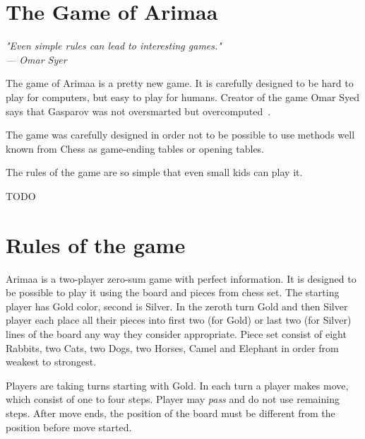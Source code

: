\section{The Game of Arimaa}
\begin{flushright}
\emph{"Even simple rules can lead to interesting games."\\
--- Omar Syer}
\end{flushright}

The game of Arimaa is a pretty new game. It is carefully designed to be hard to
play for computers, but easy to play for humans. Creator of the game Omar Syed
says that Gasparov was not oversmarted but overcomputed~\cite{arimaa.com}.


The game was carefully designed in order not to be possible to use methods
well known from Chess as game-ending tables or opening tables. 

The rules of the game are so simple that even small kids can play it.

TODO



\section{Rules of the game~\cite{arimaa.com}}
Arimaa is a two-player zero-sum game with perfect information. It is designed to
be possible to play it using the board and pieces from chess set. The starting
player has Gold color, second is Silver. In the zeroth turn Gold and then
Silver player each place all their pieces into first two (for Gold) or last two
(for Silver) lines of the board any way they consider appropriate. Piece set
consist of eight Rabbits, two Cats, two Dogs, two Horses, Camel and Elephant in
order from weakest to strongest.


Players are taking turns starting with Gold. In each turn a player makes move,
which consist of one to four steps. Player may \emph{pass} and do not use
remaining steps. After move ends, the position of the board must be different
from the position before move started.

